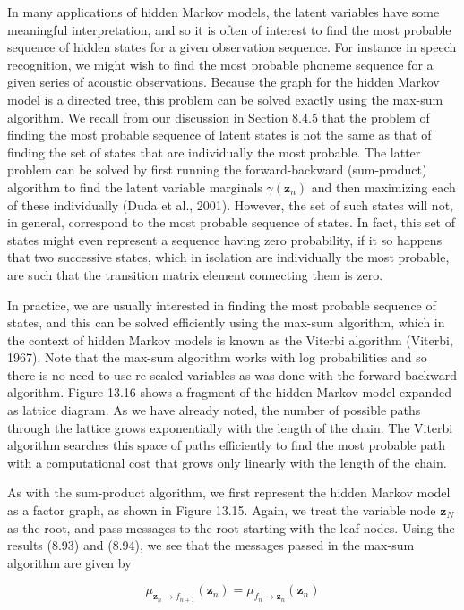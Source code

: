 \documentclass[
  10
]{article}
\begin{document}
In many applications of hidden Markov models, the latent variables have
some meaningful interpretation, and so it is often of interest to find
the most probable sequence of hidden states for a given observation
sequence. For instance in speech recognition, we might wish to find the
most probable phoneme sequence for a given series of acoustic
observations. Because the graph for the hidden Markov model is a
directed tree, this problem can be solved exactly using the max-sum
algorithm. We recall from our discussion in Section 8.4.5 that the
problem of finding the most probable sequence of latent states is not
the same as that of finding the set of states that are individually the
most probable. The latter problem can be solved by first running the
forward-backward (sum-product) algorithm to find the latent variable
marginals \(\gamma ( \mathbf { z } _ { n } )\) and then maximizing each
of these individually (Duda et al., 2001). However, the set of such
states will not, in general, correspond to the most probable sequence of
states. In fact, this set of states might even represent a sequence
having zero probability, if it so happens that two successive states,
which in isolation are individually the most probable, are such that the
transition matrix element connecting them is zero.

In practice, we are usually interested in finding the most probable
sequence of states, and this can be solved efficiently using the max-sum
algorithm, which in the context of hidden Markov models is known as the
Viterbi algorithm (Viterbi, 1967). Note that the max-sum algorithm works
with log probabilities and so there is no need to use re-scaled
variables as was done with the forward-backward algorithm. Figure 13.16
shows a fragment of the hidden Markov model expanded as lattice diagram.
As we have already noted, the number of possible paths through the
lattice grows exponentially with the length of the chain. The Viterbi
algorithm searches this space of paths efficiently to find the most
probable path with a computational cost that grows only linearly with
the length of the chain.

As with the sum-product algorithm, we first represent the hidden Markov
model as a factor graph, as shown in Figure 13.15. Again, we treat the
variable node \(\mathbf { z } _ { N }\) as the root, and pass messages
to the root starting with the leaf nodes. Using the results (8.93) and
(8.94), we see that the messages passed in the max-sum algorithm are
given by

\[
\mu_ {\mathbf {z} _ {n} \to f _ {n + 1}} (\mathbf {z} _ {n}) = \mu_ {f _ {n} \to \mathbf {z} _ {n}} (\mathbf {z} _ {n})\tag{13.66}
\]
\end{document}
